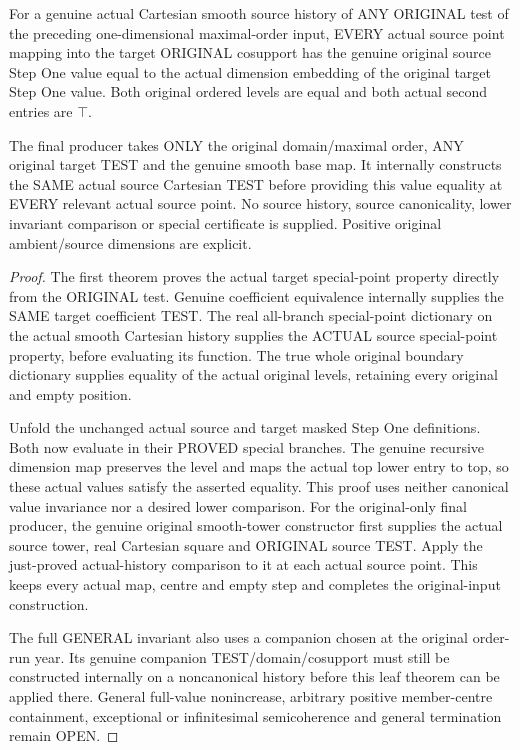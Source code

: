 \begin{theorem}
\label{hir:original-smooth-any-test-curve-stepone-value}
\leanok
For a genuine actual Cartesian smooth source history of ANY ORIGINAL test
of the preceding one-dimensional maximal-order input, EVERY actual source
point mapping into the target ORIGINAL cosupport has the genuine original
source Step One value equal to the actual dimension embedding of the
original target Step One value. Both original ordered levels are equal and
both actual second entries are $\top$.

The final producer takes ONLY the original domain/maximal order, ANY
original target TEST and the genuine smooth base map. It internally
constructs the SAME actual source Cartesian TEST before providing this
value equality at EVERY relevant actual source point. No source history,
source canonicality, lower invariant comparison or special certificate is
supplied. Positive original ambient/source dimensions are explicit.
\end{theorem}
\begin{proof}
The first theorem proves the actual target special-point property directly
from the ORIGINAL test. Genuine coefficient equivalence internally supplies
the SAME target coefficient TEST. The real all-branch special-point
dictionary on the actual smooth Cartesian history supplies the ACTUAL
source special-point property, before evaluating its function. The true
whole original boundary dictionary supplies equality of the actual original
levels, retaining every original and empty position.

Unfold the unchanged actual source and target masked Step One definitions.
Both now evaluate in their PROVED special branches. The genuine recursive
dimension map preserves the level and maps the actual top lower entry to
top, so these actual values satisfy the asserted equality. This proof uses
neither canonical value invariance nor a desired lower comparison.
For the original-only final producer, the genuine original smooth-tower
constructor first supplies the actual source tower, real Cartesian square
and ORIGINAL source TEST. Apply the just-proved actual-history comparison
to it at each actual source point. This keeps every actual map, centre and
empty step and completes the original-input construction.

The full GENERAL invariant also uses a companion chosen at the original
order-run year. Its genuine companion TEST/domain/cosupport must still be
constructed internally on a noncanonical history before this leaf theorem
can be applied there. General full-value nonincrease, arbitrary positive
member-centre containment, exceptional or infinitesimal semicoherence and
general termination remain OPEN.
\end{proof}
